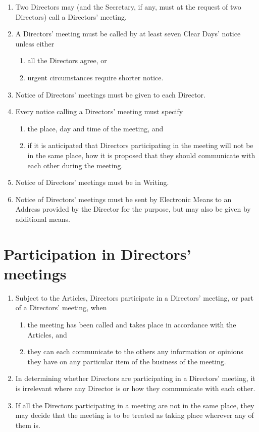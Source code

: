 \documentclass[a4paper,12pt]{article}
\begin{document}
\begin{enumerate}
  \item Two Directors may (and the Secretary, if any, must at the request of two Directors) call a Directors’ meeting.
  \item	A Directors’ meeting must be called by at least seven Clear Days’ notice unless either
    \begin{enumerate}
      \item all the Directors agree, or
      \item urgent circumstances require shorter notice.
    \end{enumerate}
  \item Notice of Directors’ meetings must be given to each Director.
  \item Every notice calling a Directors’ meeting must specify
    \begin{enumerate}
      \item	the place, day and time of the meeting, and
      \item if it is anticipated that Directors participating in the meeting will not be in the same place, how it is proposed that they should communicate with each other during the meeting.
    \end{enumerate}
  \item Notice of Directors’ meetings must be in Writing. %
  \item	Notice of Directors’ meetings must be sent by Electronic Means to an Address provided by the Director for the purpose, but may also be given by additional means. %
\end{enumerate}

\section{Participation in Directors' meetings}

\begin{enumerate}
  \item Subject to the Articles, Directors participate in a Directors’ meeting, or part of a Directors’ meeting, when
  \begin{enumerate}
    \item the meeting has been called and takes place in accordance with the Articles, and
    \item they can each communicate to the others any information or opinions they have on any particular item of the business of the meeting.
  \end{enumerate}
  \item In determining whether Directors are participating in a Directors’ meeting, it is irrelevant where any Director is or how they communicate with each other.
  \item If all the Directors participating in a meeting are not in the same place, they may decide that the meeting is to be treated as taking place wherever any of them is.
\end{enumerate}
\end{document}
